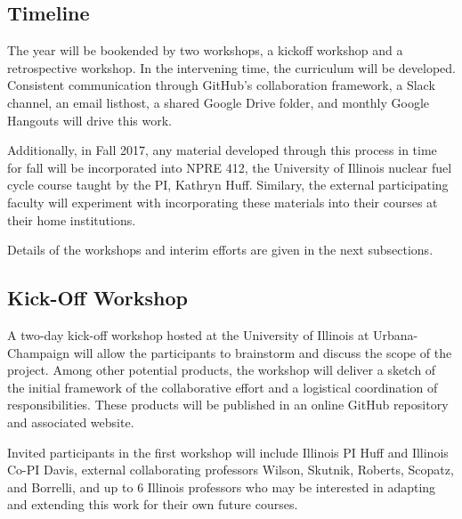 \documentclass[11pt]{article}
\begin{document}
          \subsection{Timeline}
          The year will be bookended by two workshops, a kickoff workshop 
          and a retrospective workshop. In the intervening time, the curriculum 
          will be developed. Consistent 
          communication through GitHub's collaboration framework, a Slack 
          channel, an email listhost, a shared Google Drive folder, and monthly 
          Google Hangouts will drive this work.

          Additionally, in Fall 2017, any material developed through this 
          process in time for fall will be incorporated into NPRE 412, the 
          University of Illinois nuclear fuel cycle course taught by the PI, 
          Kathryn Huff. Similary, the external participating faculty will 
          experiment with incorporating these materials into their courses at 
          their home institutions. 


          Details of the workshops and interim efforts are given in the next 
          subsections.

          \subsection{Kick-Off Workshop}
          A two-day kick-off workshop hosted at the University of Illinois at 
          Urbana-Champaign will allow the 
          participants to brainstorm and discuss the scope of the project.
          Among other potential products, the workshop will deliver
          a sketch of the initial framework of the collaborative effort and
          a logistical coordination of responsibilities. These products will
          be published in an online GitHub repository 
          and associated website.

          Invited participants in the first workshop will include Illinois PI Huff 
          and Illinois Co-PI Davis, external collaborating professors Wilson, 
          Skutnik, Roberts, Scopatz, and Borrelli, and up to 6 Illinois professors 
          who may be interested in adapting and extending this work for their own 
          future courses.
\end{document}
